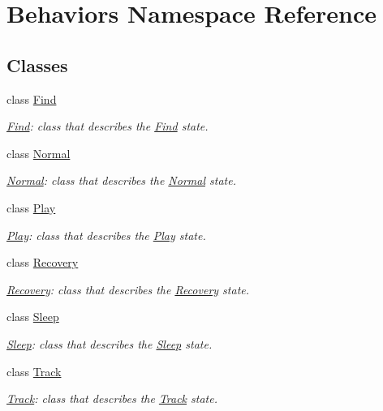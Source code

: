 \hypertarget{namespaceBehaviors}{}\section{Behaviors Namespace Reference}
\label{namespaceBehaviors}
\subsection*{Classes}
\begin{DoxyCompactItemize}
\item 
class \hyperlink{classBehaviors_1_1Find}{Find}
\begin{DoxyCompactList}\small\item\em \hyperlink{classBehaviors_1_1Find}{Find}\+: class that describes the \hyperlink{classBehaviors_1_1Find}{Find} state. \end{DoxyCompactList}\item 
class \hyperlink{classBehaviors_1_1Normal}{Normal}
\begin{DoxyCompactList}\small\item\em \hyperlink{classBehaviors_1_1Normal}{Normal}\+: class that describes the \hyperlink{classBehaviors_1_1Normal}{Normal} state. \end{DoxyCompactList}\item 
class \hyperlink{classBehaviors_1_1Play}{Play}
\begin{DoxyCompactList}\small\item\em \hyperlink{classBehaviors_1_1Play}{Play}\+: class that describes the \hyperlink{classBehaviors_1_1Play}{Play} state. \end{DoxyCompactList}\item 
class \hyperlink{classBehaviors_1_1Recovery}{Recovery}
\begin{DoxyCompactList}\small\item\em \hyperlink{classBehaviors_1_1Recovery}{Recovery}\+: class that describes the \hyperlink{classBehaviors_1_1Recovery}{Recovery} state. \end{DoxyCompactList}\item 
class \hyperlink{classBehaviors_1_1Sleep}{Sleep}
\begin{DoxyCompactList}\small\item\em \hyperlink{classBehaviors_1_1Sleep}{Sleep}\+: class that describes the \hyperlink{classBehaviors_1_1Sleep}{Sleep} state. \end{DoxyCompactList}\item 
class \hyperlink{classBehaviors_1_1Track}{Track}
\begin{DoxyCompactList}\small\item\em \hyperlink{classBehaviors_1_1Track}{Track}\+: class that describes the \hyperlink{classBehaviors_1_1Track}{Track} state. \end{DoxyCompactList}\end{DoxyCompactItemize}

